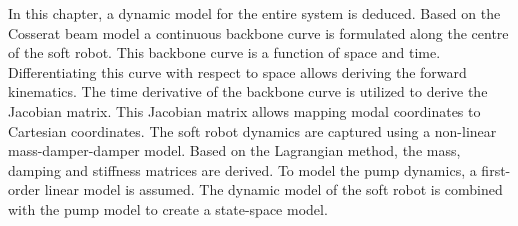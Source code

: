 In this chapter, a dynamic model for the entire system is deduced. Based on the Cosserat beam model a continuous backbone curve is formulated along the centre of the soft robot. This backbone curve is a function of space and time. Differentiating this curve with respect to space allows deriving the forward kinematics. The time derivative of the backbone curve is utilized to derive the Jacobian matrix. This Jacobian matrix allows mapping modal coordinates to Cartesian coordinates. The soft robot dynamics are captured using a non-linear mass-damper-damper model. Based on the Lagrangian method, the mass, damping and stiffness matrices are derived. To model the pump dynamics, a first-order linear model is assumed. The dynamic model of the soft robot is combined with the pump model to create a state-space model. 
